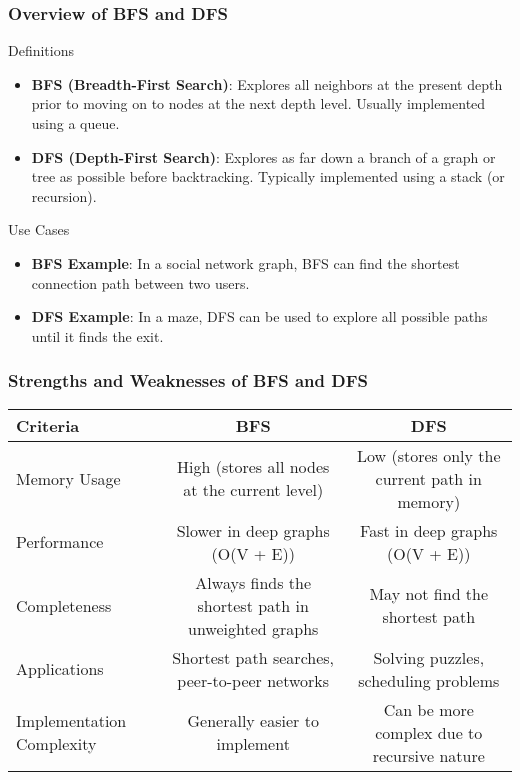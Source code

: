 \documentclass[aspectratio=169]{beamer}
\begin{document}
\begin{frame}
    \frametitle{Overview of BFS and DFS}
    \begin{block}{Definitions}
        \begin{itemize}
            \item \textbf{BFS (Breadth-First Search)}: Explores all neighbors at the present depth prior to moving on to nodes at the next depth level. Usually implemented using a queue.
            \item \textbf{DFS (Depth-First Search)}: Explores as far down a branch of a graph or tree as possible before backtracking. Typically implemented using a stack (or recursion).
        \end{itemize}
    \end{block}
    \begin{block}{Use Cases}
        \begin{itemize}
            \item \textbf{BFS Example}: In a social network graph, BFS can find the shortest connection path between two users.
            \item \textbf{DFS Example}: In a maze, DFS can be used to explore all possible paths until it finds the exit.
        \end{itemize}
    \end{block}
\end{frame}

\begin{frame}
    \frametitle{Strengths and Weaknesses of BFS and DFS}
    \begin{tabular}{|l|c|c|}
        \hline
        \textbf{Criteria} & \textbf{BFS} & \textbf{DFS} \\
        \hline
        Memory Usage & High (stores all nodes at the current level) & Low (stores only the current path in memory) \\
        Performance & Slower in deep graphs (O(V + E)) & Fast in deep graphs (O(V + E)) \\
        Completeness & Always finds the shortest path in unweighted graphs & May not find the shortest path \\
        Applications & Shortest path searches, peer-to-peer networks & Solving puzzles, scheduling problems \\
        Implementation Complexity & Generally easier to implement & Can be more complex due to recursive nature \\
        \hline
    \end{tabular}
\end{frame}
\end{document}
